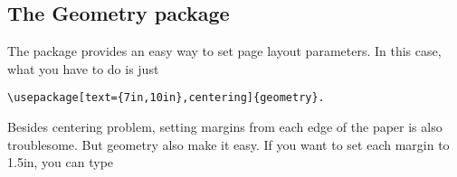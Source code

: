 \subsection{The Geometry package}

The package  \citep{geometry} provides
an easy way to set page layout parameters. In this case, what you have to do is just

\begin{verbatim}
\usepackage[text={7in,10in},centering]{geometry}.
\end{verbatim}

Besides centering problem, setting margins from each edge of the paper is also troublesome. But geometry
also make it easy. If you want to set each margin to 1.5in, you can type

\begin{comment}
\label{sec:geometry}

\def\OpenB{{\ttfamily\char`\{}}
 \def\Comma{{\ttfamily\char`,}}
 \def\CloseB{{\ttfamily\char`\}}}
 \def\Gm{\textsf{geometry}}
\newcommand\gpart[1]{\textsf{\textsl{\color[rgb]{.0,.45,.7}#1}}}%

\newcommand\glen[1]{\textsf{#1}}


\end{comment}
